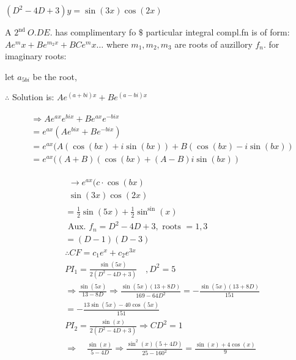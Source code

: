 \documentclass[12pt, a4paper]{article}
\begin{document}
$\left(D^{2}-4 D+3\right) y=\sin(3 x) \cos(2 x)$

A $2^{\text{nd }} O . D E$. has complimentary fo $\$$ particular integral compl.fn is of form: $A e^{m} x+B e^{m_{2} x}+B C e^{m} x \ldots$ where $m_{1}, m_{2}, m_{3}$ are roots of auzillory $f_{n}$. for imaginary roots:

	let $a_{5 b i}$ be the root,

	$\therefore$ Solution is: $A e^{(a+b i) x}+B e^{(a-b i) x}$

$$
\begin{aligned}
	 & \Rightarrow A e^{a x} e^{b i x}+B e^{a x} e^{-b i x}       \\
	 & =e^{a x}\left(A e^{b i x}+B e^{-b i x}\right)              \\
	 & =e^{a x}(A(\cos(b x)+i \sin(b x))+B(\cos(b x)-i \sin(b x)) \\
	 & =e^{a x}((A+B)(\cos(b x)+(A-B) i \sin(b x))
\end{aligned}
$$

$$
\begin{aligned}
	 & \begin{array}{l}
		   \rightarrow e^{a x}(c \cdot \cos(b x) \\
		   \sin(3 x) \cos(2 x)
	   \end{array}                                                                                  \\
	 & =\frac{1}{2} \sin(5 x)+\frac{1}{2} \sin ^{\sin }(x)                                                                    \\
	 & \text{ Aux. } f_{n}=D^{2}-4 D+3, \text{ roots }=1,3                                                                    \\
	 & =(D-1)(D-3)                                                                                                            \\
	 & \therefore C F=c_{1} e^{x}+c_{2} e^{3 x}                                                                               \\
	 & P I_{1}=\frac{\sin(5 x)}{2\left(D^{2}-4 D+3\right)} \quad, D^{2}=5                                                     \\
	 & \Rightarrow \frac{\sin(5 x)}{13-8 D} \Rightarrow \frac{\sin(5 x)(13+8 D)}{169-64 D^{2}}=-\frac{\sin(5 x)(13+8 D)}{151} \\
	 & =-\frac{13 \sin(5 x)-40 \cos(5 x)}{151}                                                                                \\
	 & P I_{2}=\frac{\sin(x)}{2\left(D^{2}-4 D+3\right)} \Rightarrow C D^{2}=1                                                \\
	 & \Rightarrow \quad \frac{\sin(x)}{5-4 D} \Rightarrow \frac{\sin^{2}(x)(5+4 D)}{25-160^{2}}=\frac{\sin(x)+4 \cos(x)}{9}
\end{aligned}
$$
\end{document}
